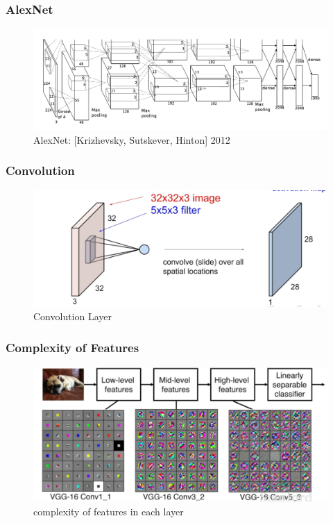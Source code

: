 \documentclass{beamer}
\begin{document}
\begin{frame}
\frametitle{AlexNet}

	\begin{figure}
		\includegraphics[width=\linewidth]{Pics/alexnet.png}
		\caption{AlexNet: [Krizhevsky, Sutskever, Hinton] 2012}
	\end{figure}

\end{frame}
\begin{frame}
\frametitle{Convolution}

\begin{figure}
	\includegraphics[width=\linewidth]{Pics/cnlayer.png}
	\caption{Convolution Layer}
\end{figure}

\end{frame}

\begin{frame}
\frametitle{Complexity of Features}

\begin{figure}
	\includegraphics[width=\linewidth]{Pics/hlayer.png}
	\caption{complexity of features in each layer}
\end{figure}
\end{frame}
\end{document}
